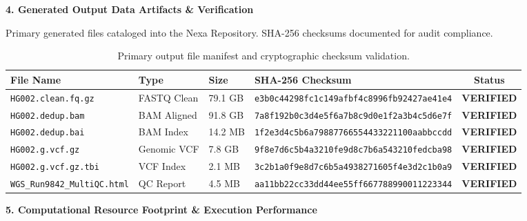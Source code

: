 \documentclass[10pt,a4paper]{article}
\newcommand{\sectionheading}[2]{%
  \vspace{6pt}%
  \begin{tcolorbox}[sectiontitle]%
    \normalsize\bfseries\color{NavyDark}#1 \quad \small\color{TextMuted}#2%
  \end{tcolorbox}%
  \vspace{2pt}%
}
\begin{document}
\vspace{6pt}

\sectionheading{4. Generated Output Data Artifacts \& Verification}{\faFolderOpen}

{\small Primary generated files cataloged into the Nexa Repository. SHA-256 checksums documented for audit compliance.}

\vspace{3pt}

\begin{table}[h!]
\centering
\scriptsize
{}
\begin{tabularx}{\textwidth}{@{}l l l X c@{}}
\toprule
\textbf{File Name} & \textbf{Type} & \textbf{Size} & \textbf{SHA-256 Checksum} & \textbf{Status} \\
\midrule
\texttt{HG002.clean.fq.gz} & FASTQ Clean & 79.1 GB & \texttt{e3b0c44298fc1c149afbf4c8996fb92427ae41e4} & \textcolor{StatusGreen}{\textbf{VERIFIED}} \\{}
\texttt{HG002.dedup.bam} & BAM Aligned & 91.8 GB & \texttt{7a8f192b0c3d4e5f6a7b8c9d0e1f2a3b4c5d6e7f} & \textcolor{StatusGreen}{\textbf{VERIFIED}} \\{}
\texttt{HG002.dedup.bai} & BAM Index & 14.2 MB & \texttt{1f2e3d4c5b6a79887766554433221100aabbccdd} & \textcolor{StatusGreen}{\textbf{VERIFIED}} \\{}
\texttt{HG002.g.vcf.gz} & Genomic VCF & 7.8 GB & \texttt{9f8e7d6c5b4a3210fe9d8c7b6a543210fedcba98} & \textcolor{StatusGreen}{\textbf{VERIFIED}} \\{}
\texttt{HG002.g.vcf.gz.tbi} & VCF Index & 2.1 MB & \texttt{3c2b1a0f9e8d7c6b5a4938271605f4e3d2c1b0a9} & \textcolor{StatusGreen}{\textbf{VERIFIED}} \\{}
\texttt{WGS\_Run9842\_MultiQC.html} & QC Report & 4.5 MB & \texttt{aa11bb22cc33dd44ee55ff667788990011223344} & \textcolor{StatusGreen}{\textbf{VERIFIED}} \\
\bottomrule
\end{tabularx}
\caption{Primary output file manifest and cryptographic checksum validation.}
\end{table}

\vspace{4pt}

\sectionheading{5. Computational Resource Footprint \& Execution Performance}{\faMicrochip}
\end{document}
